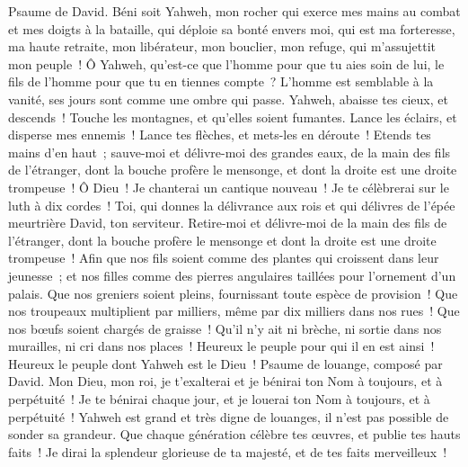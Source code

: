 \begin{multicols}{2}
\VerseOne{}Psaume de David. Béni soit Yahweh, mon rocher qui exerce mes mains au combat et mes doigts à la bataille,
qui déploie sa bonté envers moi, qui est ma forteresse, ma haute retraite, mon libérateur, mon bouclier, mon refuge, qui m'assujettit mon peuple~!
Ô Yahweh, qu'est-ce que l'homme pour que tu aies soin de lui, le fils de l'homme pour que tu en tiennes compte~?
L'homme est semblable à la vanité, ses jours sont comme une ombre qui passe.
Yahweh, abaisse tes cieux, et descends~! Touche les montagnes, et qu'elles soient fumantes.
Lance les éclairs, et disperse mes ennemis~! Lance tes flèches, et mets-les en déroute~!
Etends tes mains d'en haut~; sauve-moi et délivre-moi des grandes eaux, de la main des fils de l'étranger,
dont la bouche profère le mensonge, et dont la droite est une droite trompeuse~!
Ô Dieu~! Je chanterai un cantique nouveau~! Je te célèbrerai sur le luth à dix cordes~!
Toi, qui donnes la délivrance aux rois et qui délivres de l'épée meurtrière David, ton serviteur.
Retire-moi et délivre-moi de la main des fils de l'étranger, dont la bouche profère le mensonge et dont la droite est une droite trompeuse~!
Afin que nos fils soient comme des plantes qui croissent dans leur jeunesse~; et nos filles comme des pierres angulaires taillées pour l'ornement d'un palais.
Que nos greniers soient pleins, fournissant toute espèce de provision~! Que nos troupeaux multiplient par milliers, même par dix milliers dans nos rues~!
Que nos bœufs soient chargés de graisse~! Qu'il n'y ait ni brèche, ni sortie dans nos murailles, ni cri dans nos places~!
Heureux le peuple pour qui il en est ainsi~! Heureux le peuple dont Yahweh est le Dieu~!
\VerseOne{}Psaume de louange, composé par David.  Mon Dieu, mon roi, je t'exalterai et je bénirai ton Nom à toujours, et à perpétuité~!
 Je te bénirai chaque jour, et je louerai ton Nom à toujours, et à perpétuité~!
 Yahweh est grand et très digne de louanges, il n'est pas possible de sonder sa grandeur.
 Que chaque génération célèbre tes œuvres, et publie tes hauts faits~!
 Je dirai la splendeur glorieuse de ta majesté, et de tes faits merveilleux~!

\end{multicols}
